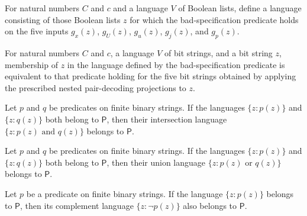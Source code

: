 \begin{definition}
\label{Complexity.KarpLipton.badLang}
\leanok
{}
For natural numbers $C$ and $c$ and a language $V$ of Boolean lists, define a language
consisting of those Boolean lists $z$ for which the bad-specification predicate holds on
the five inputs $g_x(z)$, $g_U(z)$, $g_u(z)$, $g_j(z)$, and $g_p(z)$.
\end{definition}

\begin{theorem}
\label{Complexity.KarpLipton.mem_badLang}
\leanok
{}
For natural numbers $C$ and $c$, a language $V$ of bit strings, and a bit string $z$,
membership of $z$ in the language defined by the bad-specification predicate is
equivalent to that predicate holding for the five bit strings obtained by applying the
prescribed nested pair-decoding projections to $z$.
\end{theorem}

\begin{theorem}
\label{Complexity.KarpLipton.pred_and}
\leanok
{}
Let $p$ and $q$ be predicates on finite binary strings. If the languages $\{z :
p(z)\}$ and $\{z : q(z)\}$ both belong to $\mathsf{P}$, then their intersection
language $\{z : p(z) \text{ and } q(z)\}$ belongs to $\mathsf{P}$.
\end{theorem}

\begin{theorem}
\label{Complexity.KarpLipton.pred_or}
\leanok
{}
Let $p$ and $q$ be predicates on finite binary strings. If the languages $\{z :
p(z)\}$ and $\{z : q(z)\}$ both belong to $\mathsf{P}$, then their union language
$\{z : p(z) \text{ or } q(z)\}$ belongs to $\mathsf{P}$.
\end{theorem}

\begin{theorem}
\label{Complexity.KarpLipton.pred_not}
\leanok
{}
Let $p$ be a predicate on finite binary strings. If the language $\{z : p(z)\}$
belongs to $\mathsf{P}$, then its complement language $\{z : \neg p(z)\}$ also
belongs to $\mathsf{P}$.
\end{theorem}

